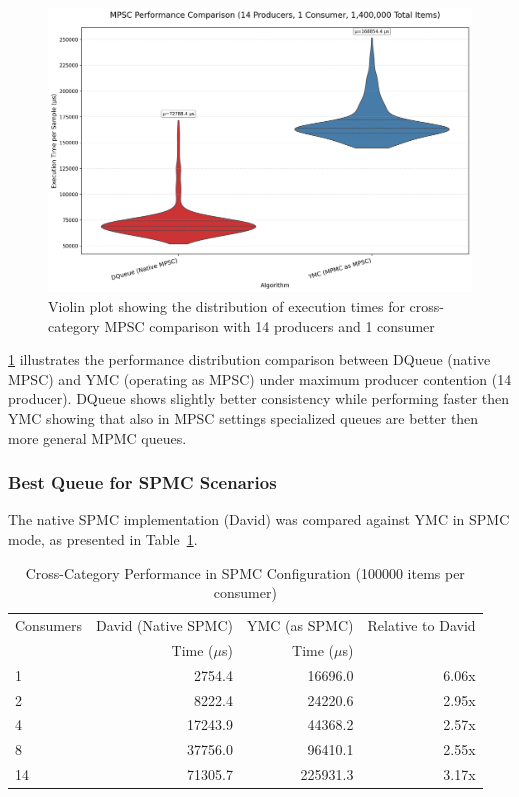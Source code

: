 \begin{figure}[htb]
\centering
\caption{Violin plot showing the distribution of execution times for cross-category MPSC comparison with 14 producers and 1 consumer}
\label{fig:cross-mpsc-violin-14p}
\includegraphics[width=\textwidth]{images/results/best_in_mpsc_performance_violin_14P1C.png}
\end{figure}

\cref{fig:cross-mpsc-violin-14p} illustrates the performance distribution comparison between DQueue (native MPSC) and \ac{YMC} (operating as MPSC) under maximum producer contention (14 producer). DQueue shows slightly better consistency while performing faster then \ac{YMC} showing that also in \ac{MPSC} settings specialized queues are better then more general \ac{MPMC} queues.

\subsubsection{Best Queue for \ac{SPMC} Scenarios}\label{subsubsec:cross-spmc}
The native \ac{SPMC} implementation (David) was compared against \ac{YMC} in \ac{SPMC} mode, as presented in Table~\ref{tab:best-spmc}.

\begin{table}[htb]
\centering
\caption{Cross-Category Performance in \ac{SPMC} Configuration (100000 items per consumer)}
\label{tab:best-spmc}
\begin{tabular}{@{}lrrr@{}}
\toprule
Consumers & David (Native \ac{SPMC}) & \ac{YMC} (as \ac{SPMC}) & Relative to David \\
& Time ($\mu$s) & Time ($\mu$s) & \\
\midrule
1 & 2754.4 & 16696.0 & 6.06x \\
2 & 8222.4 & 24220.6 & 2.95x \\
4 & 17243.9 & 44368.2 & 2.57x \\
8 & 37756.0 & 96410.1 & 2.55x \\
14 & 71305.7 & 225931.3 & 3.17x \\
\bottomrule
\end{tabular}
\end{table}

